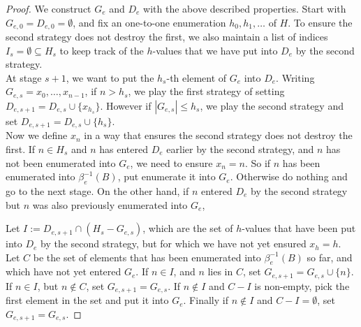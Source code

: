 \begin{proof}
  We construct $G_e$ and $D_e$ with the above described properties. Start
  with $G_{e,0}=D_{e,0}=\emptyset$, and fix an one-to-one enumeration
  $h_0,h_1,\ldots$ of $H$. To ensure the second strategy does not destroy
  the first, we also maintain a list of indices $I_s=\emptyset\subseteq
  H_s$ to keep track of the $h$-values that we have put into $D_e$ by the
  second strategy.\\

  At stage $s+1$, we want to put the $h_s$-th element of $G_e$ into $D_e$.
  Writing $G_{e,s}=x_0,\ldots,x_{n-1}$, if $n>h_s$, we play the first
  strategy of setting $D_{e,s+1} =D_{e,s} \cup \{x_{h_s}\}$. However if
  $|G_{e,s}|\leq h_s$, we play the second strategy and set $D_{e,s+1}
  =D_{e,s} \cup \{h_s\}$.\\

  Now we define $x_{n}$ in a way that ensures the second strategy does not
  destroy the first. If $n\in H_s$ and $n$ has entered $D_e$ earlier by the
  second strategy, and $n$ has not been enumerated into $G_e$, we need to
  ensure $x_n=n$. So if $n$ has been enumerated into $\beta_e^{-1}(B)$, put
  enumerate it into $G_e$. Otherwise do nothing and go to the next stage.
  On the other hand, if $n$ entered $D_e$ by the second strategy but $n$
  was also previously enumerated into $G_e$, 
  
  
  Let $I:=D_{e,s+1} \cap (H_s-G_{e,s})$, which are the
  set of $h$-values that have been put into $D_e$ by the second strategy,
  but for which we have not yet ensured $x_h=h$. Let $C$ be the set of
  elements that has been enumerated into $\beta_e^{-1}(B)$ so far, and
  which have not yet entered $G_e$. If $n\in I$, and $n$ lies in $C$, set
  $G_{e,s+1}=G_{e,s}\cup\{n\}$. If $n\in I$, but $n\not\in C$, set
  $G_{e,s+1}=G_{e,s}$. If $n\not\in I$ and $C-I$ is non-empty, pick the
  first element in the set and put it into $G_e$.  Finally if $n\not\in I$
  and $C-I=\emptyset$, set $G_{e,s+1}=G_{e,s}$.
\end{proof}
